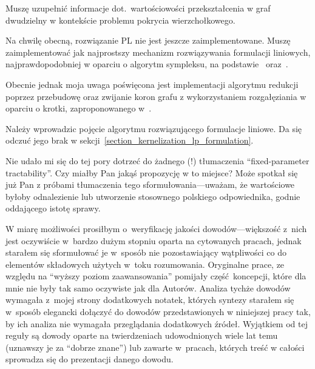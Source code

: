 \begin{note}
  Muszę uzupełnić informacje dot.\ wartościowości przekształcenia w graf
  dwudzielny w kontekście problemu pokrycia wierzchołkowego.
\end{note}
\begin{note}
  Na chwilę obecną, rozwiązanie PL nie jest jeszcze zaimplementowane.
  Muszę zaimplementować jak najprostszy mechanizm rozwiązywania formulacji
  liniowych, najprawdopodobniej w oparciu o algorytm sympleksu, na
  podstawie~\cite{sedgewick11} oraz~\cite{Cormen:2001:IA:580470}.


  Obecnie jednak moja uwaga poświęcona jest implementacji algorytmu redukcji 
  poprzez przebudowę oraz zwijanie koron grafu z wykorzystaniem rozgałęziania w
  oparciu o krotki, zaproponowanego w~\cite{ImprovedBounds10}. 
\end{note}
\begin{note}
  Należy wprowadzic pojęcie algorytmu rozwiązującego formulacje liniowe. 
  Da się odczuć jego brak w sekcji~\ref{section_kernelization_lp_formulation}.
\end{note}
\begin{note}
  Nie udało mi się do tej pory dotrzeć do żadnego (!) tłumaczenia
  ``fixed-parameter tractability''.
  Czy miałby Pan jakąś propozycję w to miejsce?
  Może spotkał się już Pan z próbami tłumaczenia tego sformułowania---uważam, że
  wartościowe byłoby odnalezienie lub utworzenie stosownego polskiego
  odpowiednika, godnie oddającego istotę sprawy. 
\end{note}
\begin{note}
  W miarę możliwości prosiłbym o~weryfikację jakości dowodów---większość z~nich
  jest oczywiście w~bardzo dużym stopniu oparta na cytowanych pracach, jednak
  starałem się sformułować je w~sposób nie pozostawiający wątpliwości co do
  elementów składowych użytych w~toku rozumowania.
  Oryginalne prace, ze względu na ``wyższy poziom zaawansowania'' pomijały
  część~koncepcji, które dla mnie nie były tak samo oczywiste jak dla Autorów.
  Analiza tychże dowodów wymagała z~mojej strony dodatkowych notatek, których
  syntezy starałem się w~sposób elegancki dołączyć do dowodów przedstawionych w
  niniejszej pracy tak, by ich analiza nie wymagała przeglądania dodatkowych
  źródeł.
  Wyjątkiem od tej reguły są dowody oparte na twierdzeniach udowodnionych wiele
  lat temu (uznawszy je za ``dobrze znane'') lub zawarte w~pracach, których 
  treść w całości sprowadza się do prezentacji danego dowodu.
\end{note}
